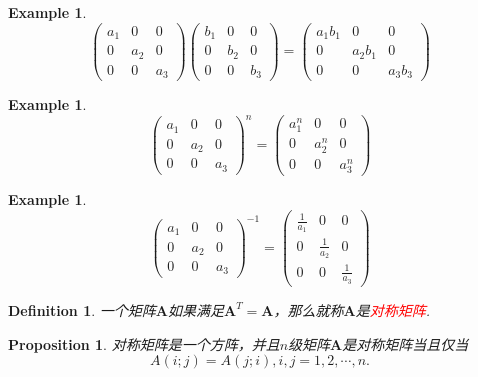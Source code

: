 \documentclass{article}
\newtheorem{proposition}[theorem]{Proposition}
\newtheorem{example}[theorem]{Example}
\newtheorem{definition}[theorem]{Definition}
\newcommand{\mbf}[1]{\bm{#1}}
\newcommand{\redt}[1]{\textcolor{red}{#1}}
\begin{document}
\begin{example}
\rm 
$$
\begin{pmatrix}
a_1 & 0 & 0\\
0 & a_2 & 0 \\
0& 0 & a_3 
\end{pmatrix}
\begin{pmatrix}
b_1 & 0 & 0\\
0 & b_2 & 0 \\
0& 0 & b_3 
\end{pmatrix} = \begin{pmatrix}
a_1b_1 & 0 & 0\\
0 & a_2b_1 & 0 \\
0& 0 & a_3b_3 
\end{pmatrix}
$$
\end{example}

\begin{example}
\rm 
$$
\begin{pmatrix}
a_1 & 0 & 0\\
0 & a_2 & 0 \\
0& 0 & a_3 
\end{pmatrix}^n = 
\begin{pmatrix}
a_1^n & 0 & 0\\
0 & a_2^n & 0 \\
0& 0 & a_3^n 
\end{pmatrix}
$$
\end{example}

\begin{example}
\rm 
$$
\begin{pmatrix}
a_1 & 0 & 0\\
0 & a_2 & 0 \\
0& 0 & a_3 
\end{pmatrix}^{-1} = \begin{pmatrix}
\frac{1}{a_1} & 0 & 0\\
0 & \frac{1}{a_2} & 0 \\
0& 0 & \frac{1}{a_3} 
\end{pmatrix}
$$
\end{example}

\begin{definition}
\rm 一个矩阵$\mbf{A}$如果满足$\mbf{A}^T = \mbf{A}$，那么就称$\mbf{A}$是\redt{对称矩阵}. 
\end{definition}

\begin{proposition}
\rm 对称矩阵是一个方阵，并且$n$级矩阵$\mbf{A}$是对称矩阵当且仅当
$$
A(i;j) = A(j;i), i,j = 1,2,\cdots,n.
$$
\end{proposition}
\end{document}
